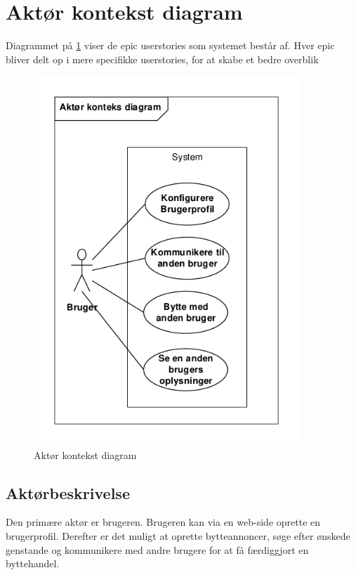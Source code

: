 \section{Aktør kontekst diagram}
Diagrammet på \ref{fig:KontekstDia} viser de epic userstories som systemet består af. Hver epic bliver delt op i mere specifikke userstories, for at skabe et bedre overblik

\begin{figure}[H]
	\includegraphics[trim = 6mm 6mm 6mm 6mm, clip, width=100mm]{figures/KontekstDiagram.PDF}
	\centering
	\caption{Aktør kontekst diagram}
	\label{fig:KontekstDia}
\end{figure}

\subsection{Aktørbeskrivelse}
Den primære aktør er brugeren. Brugeren kan via en web-side oprette en brugerprofil. Derefter er det muligt at oprette bytteannoncer, søge efter ønskede genstande og kommunikere med andre brugere for at få færdiggjort en byttehandel.